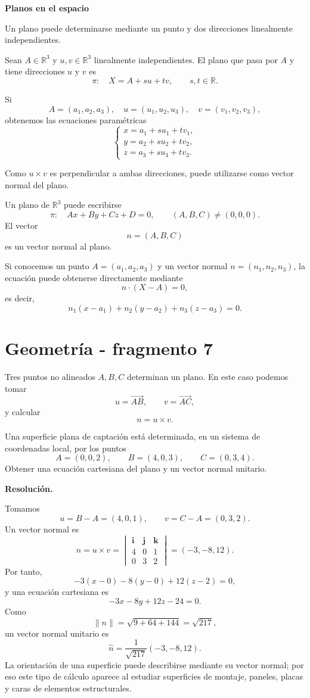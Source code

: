 \textbf{Planos en el espacio}

Un plano puede determinarse mediante un punto y dos direcciones linealmente independientes.

\begin{definition}
Sean $A\in\mathbb{R}^3$ y $u,v\in\mathbb{R}^3$ linealmente independientes. El plano que pasa por $A$ y tiene direcciones $u$ y $v$ es
\[
\pi:\quad X=A+su+tv,
\qquad s,t\in\mathbb{R}.
\]
\end{definition}

Si
\[
A=(a_1,a_2,a_3),\quad
u=(u_1,u_2,u_3),\quad
v=(v_1,v_2,v_3),
\]
obtenemos las ecuaciones paramétricas
\[
\begin{cases}
x=a_1+su_1+tv_1,\\
y=a_2+su_2+tv_2,\\
z=a_3+su_3+tv_3.
\end{cases}
\]

Como $u\times v$ es perpendicular a ambas direcciones, puede utilizarse como vector normal del plano.

\begin{definition}
Un plano de $\mathbb{R}^3$ puede escribirse
\[
\pi:\quad Ax+By+Cz+D=0,
\qquad (A,B,C)\neq(0,0,0).
\]
El vector
\[
n=(A,B,C)
\]
es un vector normal al plano.
\end{definition}

Si conocemos un punto $A=(a_1,a_2,a_3)$ y un vector normal $n=(n_1,n_2,n_3)$, la ecuación puede obtenerse directamente mediante
\[
n\cdot(X-A)=0,
\]
es decir,
\[
n_1(x-a_1)+n_2(y-a_2)+n_3(z-a_3)=0.
\]


\section{Geometría - fragmento 7}
Tres puntos no alineados $A,B,C$ determinan un plano. En este caso podemos tomar
\[
u=\overrightarrow{AB},
\qquad
v=\overrightarrow{AC},
\]
y calcular
\[
n=u\times v.
\]

\begin{solvedexercise}
Una superficie plana de captación está determinada, en un sistema de coordenadas local, por los puntos
\[
A=(0,0,2),\qquad B=(4,0,3),\qquad C=(0,3,4).
\]
Obtener una ecuación cartesiana del plano y un vector normal unitario.

\textbf{Resolución.}\par\smallskip
Tomamos
\[
u=B-A=(4,0,1),
\qquad
v=C-A=(0,3,2).
\]
Un vector normal es
\[
n=u\times v
=
\begin{vmatrix}
\mathbf i&\mathbf j&\mathbf k\\
4&0&1\\
0&3&2
\end{vmatrix}
=(-3,-8,12).
\]
Por tanto,
\[
-3(x-0)-8(y-0)+12(z-2)=0,
\]
y una ecuación cartesiana es
\[
\boxed{-3x-8y+12z-24=0.}
\]
Como
\[
\|n\|=\sqrt{9+64+144}=\sqrt{217},
\]
un vector normal unitario es
\[
\boxed{\widehat n=\frac1{\sqrt{217}}(-3,-8,12).}
\]
La orientación de una superficie puede describirse mediante su vector normal; por eso este tipo de cálculo aparece al estudiar superficies de montaje, paneles, placas y caras de elementos estructurales.
\end{solvedexercise}

